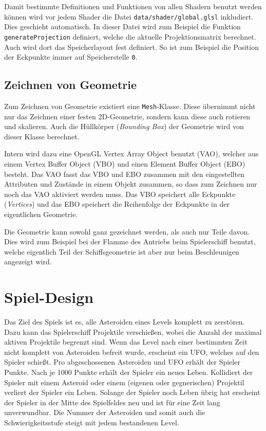 \documentclass[12pt, a4paper, titlepage, hidelinks]{scrreprt}
\begin{document}

Damit bestimmte Definitionen und Funktionen von allen Shadern benutzt werden können wird vor jedem Shader die Datei \texttt{data/shader/global.glsl} inkludiert. Dies geschieht automatisch. In dieser Datei wird zum Beispiel die Funktion \texttt{generateProjection} definiert, welche die aktuelle Projektionsmatrix berechnet. Auch wird dort das Speicherlayout fest definiert. So ist zum Beispiel die Position der Eckpunkte immer auf Speicherstelle \texttt{0}.

\subsection{Zeichnen von Geometrie}

Zum Zeichnen von Geometrie existiert eine \texttt{Mesh}-Klasse. Diese übernimmt nicht nur das Zeichnen einer festen 2D-Geometrie, sondern kann diese auch rotieren und skalieren. Auch die Hüllkörper (\textit{Bounding Box}) der Geometrie wird von dieser Klasse berechnet.

Intern wird dazu eine OpenGL Vertex Array Object benutzt (VAO), welcher aus einem Vertex Buffer Object (VBO) und einen Element Buffer Object (EBO) besteht. Das VAO fasst das VBO und EBO zusammen mit den eingestellten Attributen und Zustände in einem Objekt zusammen, so dass zum Zeichnen nur noch das VAO aktiviert werden muss. Das VBO speichert alle Eckpunkte (\textit{Vertices}) und das EBO speichert die Reihenfolge der Eckpunkte in der eigentlichen Geometrie.

Die Geometrie kann sowohl ganz gezeichnet werden, als auch nur Teile davon. Dies wird zum Beispiel bei der Flamme des Antriebs beim Spielerschiff benutzt, welche eigentlich Teil der Schiffsgeometrie ist aber nur beim Beschleunigen angezeigt wird.

\section{Spiel-Design}

Das Ziel des Spiels ist es, alle Asteroiden eines Levels komplett zu zerstören. Dazu kann das Spielerschiff Projektile verschießen, wobei die Anzahl der maximal aktiven Projektile begrenzt sind. Wenn das Level nach einer bestimmten Zeit nicht komplett von Asteroiden befreit wurde, erscheint ein UFO, welches auf den Spieler schießt. Pro abgeschossenen Asteroiden und UFO erhält der Spieler Punkte. Nach je 1000 Punkte erhält der Spieler ein neues Leben. Kollidiert der Spieler mit einem Asteroid oder einem (eigenen oder gegnerischen) Projektil verliert der Spieler ein Leben. Solange der Spieler noch Leben übrig hat erscheint der Spieler in der Mitte des Spielfeldes neu und ist für eine Zeit lang unverwundbar. Die Nummer der Asteroiden und somit auch die Schwierigkeitsstufe steigt mit jedem bestandenen Level.
\end{document}
